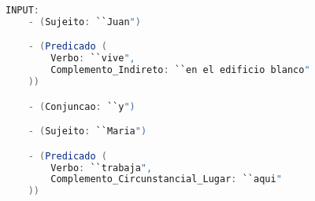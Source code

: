 \begin{center}
\begin{minipage}{13cm}
\begin{lstlisting}[language=java, basicstyle=\small, label={lst:example_complex_input22}, caption=Example of a complex sentence input]
INPUT:
    - (Sujeito: ``Juan")

    - (Predicado (
        Verbo: ``vive",
        Complemento_Indireto: ``en el edificio blanco"
    ))

    - (Conjuncao: ``y")

    - (Sujeito: ``Maria")

    - (Predicado (
        Verbo: ``trabaja",
        Complemento_Circunstancial_Lugar: ``aqui"
    ))
\end{lstlisting}
\end{minipage}
\end{center}
